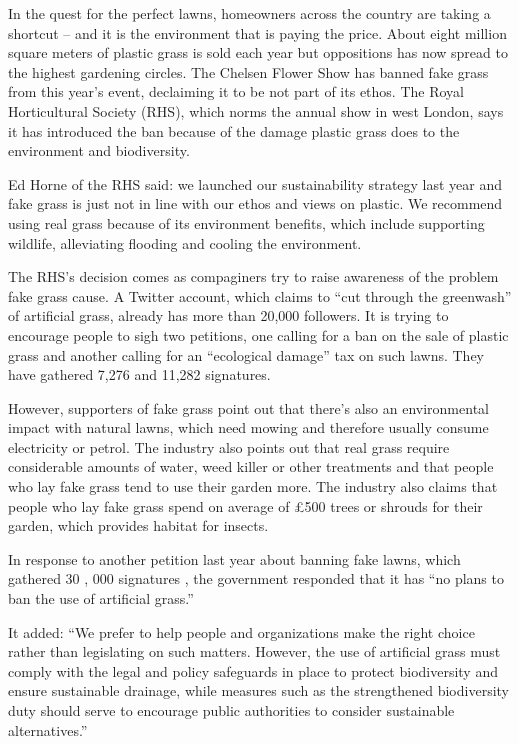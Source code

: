 In the quest for the perfect lawns, homeowners across the country are taking a shortcut -- and it is the environment that is paying the price. About eight million square meters of plastic grass is sold each year but oppositions has now spread to the highest gardening circles. The Chelsen Flower Show has banned fake grass from this year's event, declaiming it to be not part of its ethos. The Royal Horticultural Society (RHS), which norms the annual show in west London, says it has introduced the ban because of the damage plastic grass does to the environment and biodiversity.


Ed Horne of the RHS said: we launched our sustainability strategy last year and fake grass is just not in line with our ethos and views on plastic. We recommend using real grass because of its environment benefits, which include supporting wildlife, alleviating flooding and cooling the environment.


The RHS's decision comes as compaginers try to raise awareness of the problem fake grass cause. A Twitter account, which claims to ``cut through the greenwash'' of artificial grass, already has more than 20,000 followers. It is trying to encourage people to sigh two petitions, one calling for a ban on the sale of plastic grass and another calling for an ``ecological damage'' tax on such lawns. They have gathered 7,276 and 11,282 signatures.


However, supporters of fake grass point out that there's also an environmental impact with natural lawns, which need mowing and therefore usually consume electricity or petrol. The industry also points out that real grass require considerable amounts of water, weed killer or other treatments and that people who lay fake grass tend to use their garden more. The industry also claims that people who lay fake grass spend on average of £500 trees or shrouds for their garden, which provides habitat for insects.


In response to another petition last year about banning fake lawns, which gathered 30 , 000 signatures , the government responded that it has ``no plans to ban the use of artificial grass.''


It added: ``We prefer to help people and organizations make the right choice rather than legislating on such matters. However, the use of artificial grass must comply with the legal and policy safeguards in place to protect biodiversity and ensure sustainable drainage, while measures such as the strengthened biodiversity duty should serve to encourage public authorities to consider sustainable alternatives.'' 